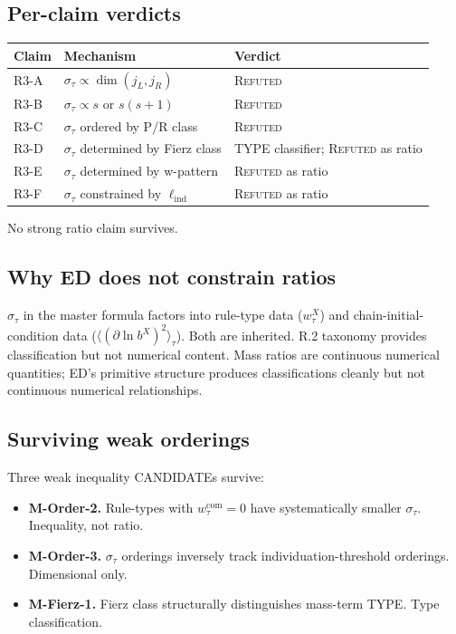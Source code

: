 \documentclass[11pt,a4paper]{article}
\begin{document}
\subsection{Per-claim verdicts}

\begin{center}
\begin{tabular}{lll}
\hline
Claim & Mechanism & Verdict \\
\hline
R3-A & $\sigma_\tau \propto \dim(j_L, j_R)$ & \textsc{Refuted} \\
R3-B & $\sigma_\tau \propto s$ or $s(s+1)$ & \textsc{Refuted} \\
R3-C & $\sigma_\tau$ ordered by P/R class & \textsc{Refuted} \\
R3-D & $\sigma_\tau$ determined by Fierz class & TYPE classifier; \textsc{Refuted} as ratio \\
R3-E & $\sigma_\tau$ determined by w-pattern & \textsc{Refuted} as ratio \\
R3-F & $\sigma_\tau$ constrained by $\ell_{\mathrm{ind}}$ & \textsc{Refuted} as ratio \\
\hline
\end{tabular}
\end{center}

No strong ratio claim survives.

\subsection{Why ED does not constrain ratios}

$\sigma_\tau$ in the master formula factors into rule-type data ($w_\tau^X$) and chain-initial-condition data ($\langle(\partial \ln b^X)^2\rangle_\tau$). Both are inherited. R.2 taxonomy provides classification but not numerical content. Mass ratios are continuous numerical quantities; ED's primitive structure produces classifications cleanly but not continuous numerical relationships.

\subsection{Surviving weak orderings}

Three weak inequality CANDIDATEs survive:
\begin{itemize}
  \item \textbf{M-Order-2.} Rule-types with $w_\tau^{\mathrm{com}} = 0$ have systematically smaller $\sigma_\tau$. Inequality, not ratio.
  \item \textbf{M-Order-3.} $\sigma_\tau$ orderings inversely track individuation-threshold orderings. Dimensional only.
  \item \textbf{M-Fierz-1.} Fierz class structurally distinguishes mass-term TYPE. Type classification.
\end{itemize}
\end{document}
